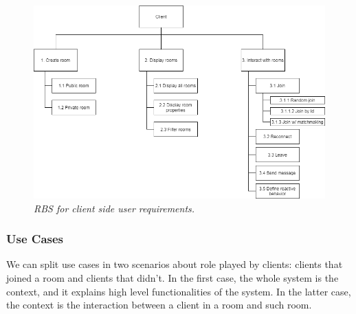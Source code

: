 \begin{figure}[H]
  \includegraphics[scale=0.5]{images/2-scoping/client-RBS.png}
   \centering  
   \caption{\textit{RBS for client side user requirements.}}
  \label{fig:client-RBS}
\end{figure}
 
\subsubsection{Use Cases}

We can split use cases in two scenarios about role played by clients: clients that joined a room and clients that didn't. In the first case, the whole system is the context, and it explains high level functionalities of the system. In the latter case, the context is the interaction between a client in a room and such room.

